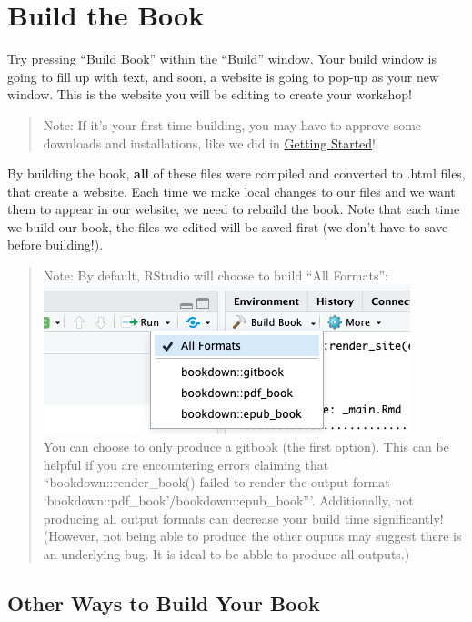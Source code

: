 \documentclass[
]{book}
\theoremstyle{definition}
\theoremstyle{definition}
\theoremstyle{definition}
\theoremstyle{definition}
\theoremstyle{remark}
\begin{document}
\section{Build the Book}\label{build-the-book}

Try pressing ``Build Book'' within the ``Build'' window. Your build window is going to fill up with text, and soon, a website is going to pop-up as your new window. This is the website you will be editing to create your workshop!

\begin{quote}
Note: If it's your first time building, you may have to approve some downloads and installations, like we did in \hyperref[get-started]{Getting Started}!
\end{quote}

By building the book, \textbf{all} of these files were compiled and converted to .html files, that create a website. Each time we make local changes to our files and we want them to appear in our website, we need to rebuild the book. Note that each time we build our book, the files we edited will be saved first (we don't have to save before building!).

\begin{quote}
Note: By default, RStudio will choose to build ``All Formats'':
\includegraphics{img/files-and-build/build-book-options.png}\\
You can choose to only produce a gitbook (the first option). This can be helpful if you are encountering errors claiming that ``bookdown::render\_book() failed to render the output format `bookdown::pdf\_book'/bookdown::epub\_book'''. Additionally, not producing all output formats can decrease your build time significantly! (However, not being able to produce the other ouputs may suggest there is an underlying bug. It is ideal to be abble to produce all outputs.)
\end{quote}

\subsection{Other Ways to Build Your Book}\label{other-ways-to-build-your-book}
\end{document}
